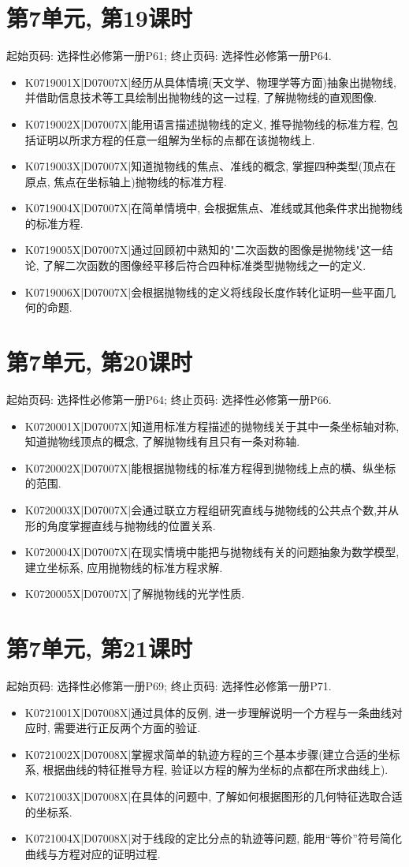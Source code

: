 \section*{第7单元, 第19课时}
起始页码: 选择性必修第一册P61; 终止页码: 选择性必修第一册P64.
\begin{itemize}
\item K0719001X|D07007X|经历从具体情境(天文学、物理学等方面)抽象出抛物线, 并借助信息技术等工具绘制出抛物线的这一过程, 了解抛物线的直观图像.
\item K0719002X|D07007X|能用语言描述抛物线的定义, 推导抛物线的标准方程, 包括证明以所求方程的任意一组解为坐标的点都在该抛物线上.
\item K0719003X|D07007X|知道抛物线的焦点、准线的概念, 掌握四种类型(顶点在原点, 焦点在坐标轴上)抛物线的标准方程.
\item K0719004X|D07007X|在简单情境中, 会根据焦点、准线或其他条件求出抛物线的标准方程.
\item K0719005X|D07007X|通过回顾初中熟知的"二次函数的图像是抛物线"这一结论, 了解二次函数的图像经平移后符合四种标准类型抛物线之一的定义.
\item K0719006X|D07007X|会根据抛物线的定义将线段长度作转化证明一些平面几何的命题.
\end{itemize}

\section*{第7单元, 第20课时}
起始页码: 选择性必修第一册P64; 终止页码: 选择性必修第一册P66.
\begin{itemize}
\item K0720001X|D07007X|知道用标准方程描述的抛物线关于其中一条坐标轴对称, 知道抛物线顶点的概念, 了解抛物线有且只有一条对称轴.
\item K0720002X|D07007X|能根据抛物线的标准方程得到抛物线上点的横、纵坐标的范围.
\item K0720003X|D07007X|会通过联立方程组研究直线与抛物线的公共点个数,并从形的角度掌握直线与抛物线的位置关系.
\item K0720004X|D07007X|在现实情境中能把与抛物线有关的问题抽象为数学模型, 建立坐标系, 应用抛物线的标准方程求解.
\item K0720005X|D07007X|了解抛物线的光学性质.
\end{itemize}

\section*{第7单元, 第21课时}
起始页码: 选择性必修第一册P69; 终止页码: 选择性必修第一册P71.
\begin{itemize}
\item K0721001X|D07008X|通过具体的反例, 进一步理解说明一个方程与一条曲线对应时, 需要进行正反两个方面的验证.
\item K0721002X|D07008X|掌握求简单的轨迹方程的三个基本步骤(建立合适的坐标系, 根据曲线的特征推导方程, 验证以方程的解为坐标的点都在所求曲线上).
\item K0721003X|D07008X|在具体的问题中, 了解如何根据图形的几何特征选取合适的坐标系.
\item K0721004X|D07008X|对于线段的定比分点的轨迹等问题, 能用``等价''符号简化曲线与方程对应的证明过程.
\end{itemize}

